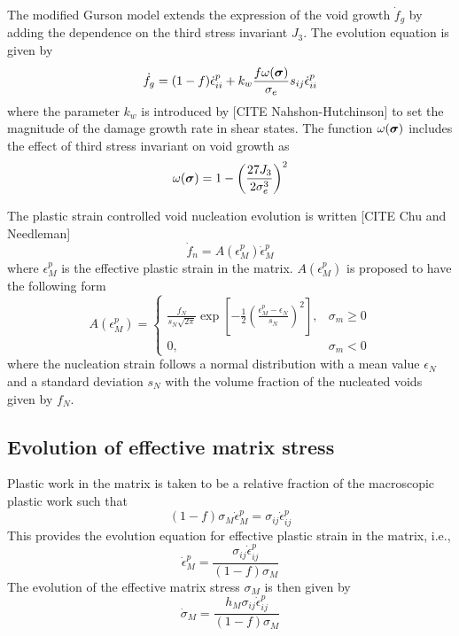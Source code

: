 The modified Gurson model extends the expression of the void growth
$\dot{f}_g$ by adding the dependence on the third stress invariant
$J_3$. The evolution equation is given by
\begin{equation}\label{eq:fgdot}
  \dot{f}_g = (1-f)\dot{\epsilon}^p_{ii} + k_w\frac{f \omega({\boldsymbol{\sigma}})}{\sigma_e}s_{ij}\dot{\epsilon}^p_{ii}
\end{equation}
where the parameter $k_w$ is introduced by [CITE Nahshon-Hutchinson]
to set the magnitude of the damage growth rate in shear states. The
function $\omega({\boldsymbol{\sigma}})$ includes the effect of third stress
invariant on void growth as
\begin{equation}
\omega({\boldsymbol{\sigma}}) = 1 - \left( \frac{27J_3}{2\sigma_e^3}\right) ^2
\end{equation}

The plastic strain controlled void nucleation evolution is written [CITE Chu and Needleman]
\begin{equation}\label{eq:fndot}
\dot{f}_n = A(\epsilon^p_M)\dot{\epsilon}^p_M
\end{equation}
where $\epsilon^p_M$ is the effective plastic strain in the matrix. $A(\epsilon^p_M)$ is proposed to have the following form
\begin{equation}
A(\epsilon^p_M) =
	\begin{cases}
		\frac{f_N}{s_N\sqrt{2\pi}}\exp\left[ -\frac{1}{2}\left( \frac{\epsilon^p_M - \epsilon_N}{s_N}\right)^2\right], & \sigma_m \geq 0\\
		0,	  & \sigma_m <0
	\end{cases}
\end{equation}
where the nucleation strain follows a normal distribution with a mean
value $\epsilon_N$ and a standard deviation $s_N$ with the volume
fraction of the nucleated voids given by $f_N$.

\subsection{Evolution of effective matrix stress}
Plastic work in the matrix is taken to be a relative fraction of the
macroscopic plastic work such that
\begin{equation}\label{eq:plastic_work}
  (1-f)\sigma_M\dot{\epsilon}^p_M = \sigma_{ij}\dot{\epsilon}^p_{ij}
\end{equation}
This provides the evolution equation for effective plastic strain in the matrix, i.e., 
\begin{equation}\label{eq:epsMpdot}
  \dot{\epsilon}^p_M = \frac{\sigma_{ij}\dot{\epsilon}^p_{ij}}{(1-f)\sigma_M}
\end{equation}
The evolution of the effective matrix stress $\sigma_M$ is then given by
\begin{equation}\label{eq:sigMdot}
  \dot{\sigma}_M = \frac{h_M\sigma_{ij}\dot{\epsilon}^p_{ij}}{(1-f)\sigma_M}
\end{equation}


